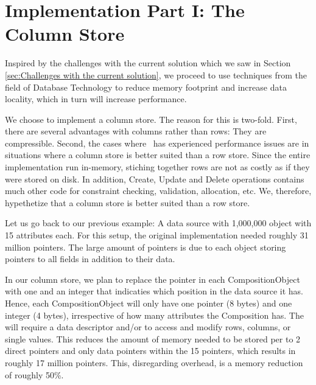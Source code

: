 \chapter{Implementation Part I: The Column Store}
\label{chap:Implementation Part I: The Column Store}
Inspired by the challenges with the current solution which we saw in Section \ref{sec:Challenges with the current solution}, we proceed to use techniques from the field of Database Technology to reduce memory footprint and increase data locality, which in turn will increase performance. 

We choose to implement a column store. The reason for this is two-fold. First, there are several advantages with columns rather than rows: They are compressible. Second, the cases where \genus~has experienced performance issues are in situations where a column store is better suited than a row store. Since the entire implementation run in-memory, stiching together rows are not as costly as if they were stored on disk. In addition, Create, Update and Delete operations contains much other code for constraint checking, validation, allocation, etc. We, therefore, hypethetize that a column store is better suited than a row store.

Let us go back to our previous example: A data source with 1,000,000 object with 15 attributes each. For this setup, the original implementation needed roughly 31 million pointers. The large amount of pointers is due to each object storing pointers to all fields in addition to their data.

In our column store, we plan to replace the  pointer in each CompositionObject with one  and an integer  that indicaties which position in the data source it has. Hence, each CompositionObject will only have one pointer (8 bytes) and one integer (4 bytes), irrespective of how many attributes the Composition has. The  will require a data descriptor and/or  to access and modify rows, columns, or single values. This reduces the amount of memory needed to be stored per  to 2 direct pointers and only data pointers within the  15 pointers, which results in roughly 17 million pointers. This, disregarding overhead, is a memory reduction of roughly 50\%.



